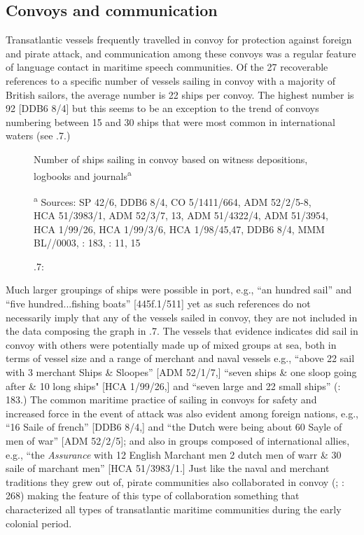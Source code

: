 \subsection{{Convoys} {and} {communication}}%

Transatlantic vessels frequently travelled in convoy for protection against foreign and pirate attack, and communication among these convoys was a regular feature of language contact in maritime speech communities. Of the 27 recoverable references to a specific number of vessels sailing in convoy with a majority of British sailors, the average number is 22 ships per convoy. The highest number is 92 [DDB6 8/4] but this seems to be an exception to the trend of convoys numbering between 15 and 30 ships that were most common in international waters (see .7.) 

\begin{figure}
  
 

\caption{\label{fig:key:4}.7:} Number of ships sailing in convoy based on witness depositions, logbooks and journals\textsuperscript{a}

\textsuperscript{a} Sources: SP 42/6, DDB6 8/4, CO 5/1411/664, ADM 52/2/5-8, HCA 51/3983/1, ADM 52/3/7, 13, ADM 51/4322/4, ADM 51/3954, HCA 1/99/26, HCA 1/99/3/6, HCA 1/98/45,47, DDB6 8/4, MMM BL/\citealt{Egerton2395}/0003, \citealt{Bicheno2012}: 183, \citealt{Gage1648}: 11, 15
\end{figure}

Much larger groupings of ships were possible in port, e.g., “an hundred sail” and “five hundred...fishing boats” [445f.1/511] yet as such references do not necessarily imply that any of the vessels sailed in convoy, they are not included in the data composing the graph in .7. The vessels that evidence indicates did sail in convoy with others were potentially made up of mixed groups at sea, both in terms of vessel size and a range of merchant and naval vessels e.g., “above 22 sail with 3 merchant Ships \& Sloopes” [ADM 52/1/7,] “seven ships \& one sloop going after \& 10 long ships" [HCA 1/99/26,] and “seven large and 22 small ships” (\citealt{Bicheno2012}: 183.) The common maritime practice of sailing in convoys for safety and increased force in the event of attack was also evident among foreign nations, e.g., “16 Saile of french” [DDB6 8/4,] and “the Dutch were being about 60 Sayle of men of war” [ADM 52/2/5]; and also in groups composed of international allies, e.g., “the \textit{Assurance} with 12 English Marchant men 2 dutch men of warr \& 30 saile of marchant men” [HCA 51/3983/1.] Just like the naval and merchant traditions they grew out of, pirate communities also collaborated in convoy (\citealt{Esquemelin1678}; \citealt{Rediker1987}: 268) making the feature of this type of collaboration something that characterized all types of transatlantic maritime communities during the early colonial period. 

